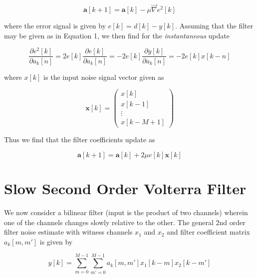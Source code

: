 \documentclass{article}
\begin{document}
\begin{equation}
    \mathbf{a}[k+1] = \mathbf{a}[k] - \mu \vec{\nabla} e^2[k]
\end{equation}

where the error signal is given by $e[k] = d[k] - y[k]$. Assuming that the filter
may be given as in Equation 1, we then find for the \emph{instantaneous} update

\begin{equation}
    \frac{\partial e^2[k]}{\partial a_k[n]}
    = 2 e[k] \frac{\partial e[k]}{\partial a_k[n]}
    = -2 e[k] \frac{\partial y[k]}{\partial a_k[n]} = -2e[k]x[k-n]
\end{equation}

where $x[k]$ is the input noise signal vector given as

\begin{equation}
    \mathbf{x}[k] = 
    \begin{pmatrix}
        x[k]\\
        x[k-1]\\
        \vdots\\
        x[k-M+1]
    \end{pmatrix}
\end{equation}

Thus we find that the filter coefficients
update as

\begin{equation}
    \mathbf{a}[k+1] = \mathbf{a}[k] + 2\mu e[k]\mathbf{x}[k]
\end{equation}

\section{Slow Second Order Volterra Filter}
We now consider a bilinear filter (input is the product of two channels) wherein
one of the channels changes slowly relative to the other. The general 2nd order
filter noise estimate with witness channels $x_1$ and $x_2$ and filter
coefficient matrix $a_k[m,m']$ is given by

\begin{equation}
    y[k] = \sum_{m=0}^{M-1}\sum_{m'=0}^{M-1} a_k[m, m']x_1[k-m]x_2[k-m']
\end{equation}
\end{document}
